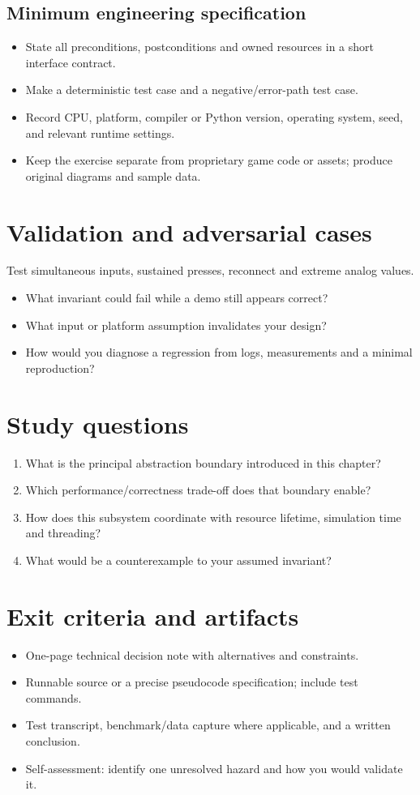 \documentclass[11pt,letterpaper]{article}
\begin{document}
\subsection{Minimum engineering specification}
\begin{itemize}
\item State all preconditions, postconditions and owned resources in a short interface contract.
\item Make a deterministic test case and a negative/error-path test case.
\item Record CPU, platform, compiler or Python version, operating system, seed, and relevant runtime settings.
\item Keep the exercise separate from proprietary game code or assets; produce original diagrams and sample data.
\end{itemize}
\section{Validation and adversarial cases}
Test simultaneous inputs, sustained presses, reconnect and extreme analog values.

\begin{itemize}
\item What invariant could fail while a demo still appears correct?
\item What input or platform assumption invalidates your design?
\item How would you diagnose a regression from logs, measurements and a minimal reproduction?
\end{itemize}
\section{Study questions}
\begin{enumerate}
\item What is the principal abstraction boundary introduced in this chapter?
\item Which performance/correctness trade-off does that boundary enable?
\item How does this subsystem coordinate with resource lifetime, simulation time and threading?
\item What would be a counterexample to your assumed invariant?
\end{enumerate}
\section{Exit criteria and artifacts}
\begin{itemize}
\item One-page technical decision note with alternatives and constraints.
\item Runnable source or a precise pseudocode specification; include test commands.
\item Test transcript, benchmark/data capture where applicable, and a written conclusion.
\item Self-assessment: identify one unresolved hazard and how you would validate it.
\end{itemize}
\end{document}
